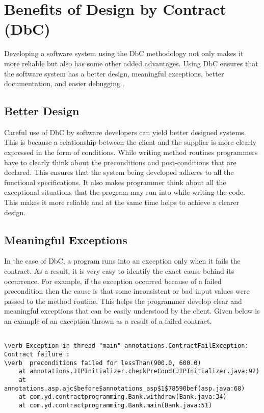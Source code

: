 \section{Benefits of Design by Contract (DbC)}

Developing a software system using the DbC methodology not only makes it more reliable but also has some other added advantages. Using DbC ensures that the software system has a better design, meaningful exceptions, better documentation, and easier debugging \cite{DesignByContractByExample}.

\subsection{Better Design}
Careful use of DbC by software developers can yield better designed systems. This is because a relationship between the client and the supplier is more clearly expressed in the form of conditions. While writing method routines programmers have to clearly think about the preconditions and post-conditions that are declared. This ensures that the system being developed adheres to all the functional specifications. It also makes programmer think about all the exceptional situations that the program may run into while writing the code. This makes it more reliable and at the same time helps to achieve a clearer design.

\subsection{Meaningful Exceptions}
In the case of DbC, a program runs into an exception only when it fails the contract. As a result, it is very easy to identify the exact cause behind its occurrence. For example, if the exception occurred because of a failed precondition then the cause is that some inconsistent or bad input values were passed to the method routine. This helps the programmer develop clear and meaningful exceptions that can be easily understood by the client.
Given below is an example of an exception thrown as a result of a failed contract. 
\linebreak

\begin{verbatim}

\verb Exception in thread "main" annotations.ContractFailException: Contract failure :
\verb  preconditions failed for lessThan(900.0, 600.0)
	at annotations.JIPInitializer.checkPreCond(JIPInitializer.java:92)
	at annotations.asp.ajc$before$annotations_asp$1$78590bef(asp.java:68)
	at com.yd.contractprogramming.Bank.withdraw(Bank.java:34)
	at com.yd.contractprogramming.Bank.main(Bank.java:51)

\end{verbatim}


